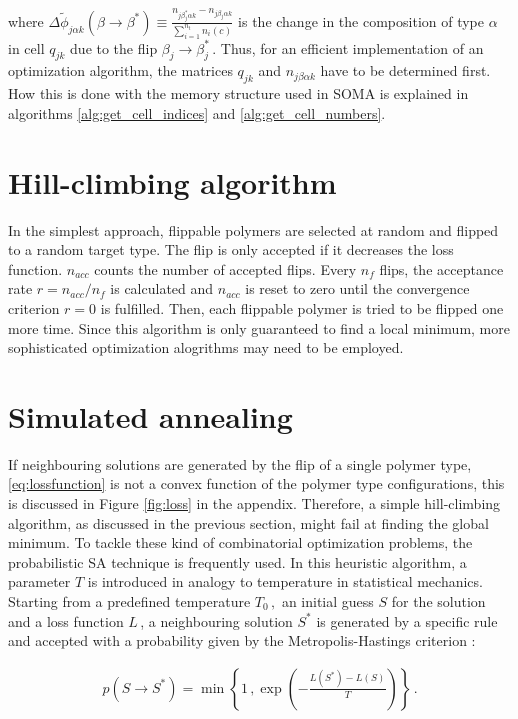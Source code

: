 \documentclass[bachelor,       %
               twoside,        %
               BCOR10mm,       %
               ngerman, english %
               ]{GAUBM}
\begin{document}
where $\Delta\tilde\phi_{ j\alpha k}(\beta\rightarrow\beta^*)\equiv\frac{n_{j\beta_j^*\alpha k}-n_{j\beta_j\alpha k}}{\sum_{i=1}^{n_t}n_i(c)}$ is the change in the composition of type $\alpha$ in cell $q_{jk}$ due to the flip $\beta_j\rightarrow\beta_j^*\,$. Thus, for an efficient implementation of an optimization algorithm, the matrices $q_{jk}$ and $n_{j\beta\alpha k}$ have to be determined first. How this is done with the memory structure used in \ac{SOMA} is explained in algorithms \ref{alg:get_cell_indices} and \ref{alg:get_cell_numbers}. 

\section{Hill-climbing algorithm}

In the simplest approach, flippable polymers are selected at random and flipped to a random target type. The flip is only accepted if it decreases the loss function. $n_{acc}$ counts the number of accepted flips. Every $n_f$ flips, the acceptance rate $r=n_{acc}/n_f$ is calculated and $n_{acc}$ is reset to zero until the convergence criterion $r=0$ is fulfilled. Then, each flippable polymer is tried to be flipped one more time. Since this algorithm is only guaranteed to find a local minimum, more sophisticated optimization alogrithms may need to be employed.

\section{Simulated annealing}

If neighbouring solutions are generated by the flip of a single polymer type, \eqref{eq:lossfunction} is not a convex function of the polymer type configurations, this is discussed in Figure \ref{fig:loss} in the appendix. Therefore, a simple hill-climbing algorithm, as discussed in the previous section, might fail at finding the global minimum. To tackle these kind of combinatorial optimization problems, the probabilistic \ac{SA} technique \cite{simulated_annealing} is frequently used. In this heuristic algorithm, a parameter $T$ is introduced in analogy to temperature in statistical mechanics. Starting from a predefined temperature $T_0\,,$ an initial guess $S$ for the solution and a loss function $L\,$, a neighbouring solution $S^*$ is generated by a specific rule and accepted with a probability given by the Metropolis-Hastings criterion \cite{metropolis}:

\begin{align}
    p(S\rightarrow S^*)=\min\left\{1\,,\exp\left(-\frac{L(S^*)-L(S)}{T}\right)\right\}\,.
\end{align}
\end{document}

